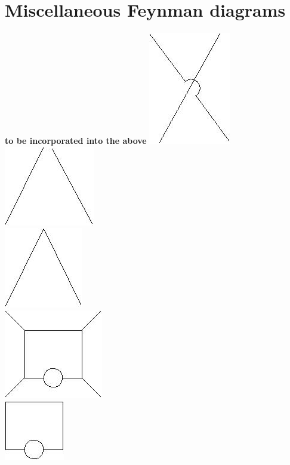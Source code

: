 \documentclass{scrartcl}
\begin{document}
\section{Miscellaneous Feynman diagrams}
\textbf{to be incorporated into the above}
\includegraphics[scale=0.3]{images/1.jpg}\\
\includegraphics[scale=0.3]{images/2.jpg}\\
\includegraphics[scale=0.3]{images/3.jpg}\\
\includegraphics[scale=0.3]{images/4.jpg}\\
\includegraphics[scale=0.3]{images/5.jpg}\\
\end{document}
